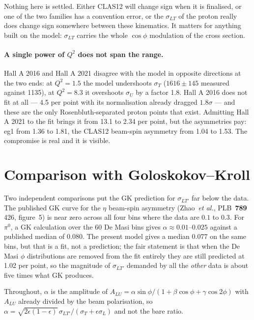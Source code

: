 \documentclass[11pt,a4paper]{article}
\newcommand{\sig}[1]{\sigma_{#1}}
\begin{document}
Nothing here is settled.  Either CLAS12 will change sign when it is finalised,
or one of the two families has a convention error, or the $\sig{LT}$ of the
proton really does change sign somewhere between these kinematics.  It matters
for anything built on the model: $\sig{LT}$ carries the whole $\cos\phi$
modulation of the cross section.

\paragraph{A single power of $Q^2$ does not span the range.}  Hall A 2016 and
Hall A 2021 disagree with the model in opposite directions at the two ends: at
$Q^2 = 1.5$ the model undershoots $\sig{T}$ ($1616 \pm 145$ measured against
1135), at $Q^2 = 8.3$ it overshoots $\sig{U}$ by a factor 1.8.  Hall A 2016
does not fit at all --- 4.5 per point with its normalisation already dragged
$1.8\sigma$ --- and these are the only Rosenbluth-separated proton points that
exist.  Admitting Hall A 2021 to the fit brings it from 13.1 to 2.34 per point,
but the asymmetries pay: eg1 from 1.36 to 1.81, the CLAS12 beam-spin asymmetry
from 1.04 to 1.53.  The compromise is real and it is visible.

\section{Comparison with Goloskokov--Kroll}

Two independent comparisons put the GK prediction for $\sig{LT'}$ far below the
data.  The published GK curve for the $\eta$ beam-spin asymmetry
(Zhao~\textit{et al.}, PLB~\textbf{789} 426, figure~5) is near zero across all
four bins where the data are $0.1$ to $0.3$.  For $\pi^0$, a GK calculation over
the 60 De Masi bins gives $\alpha \approx 0.01$--$0.025$ against a published
median of $0.080$.  The present model gives a median $0.077$ on the same bins,
but that is a fit, not a prediction; the fair statement is that when the De Masi
$\phi$ distributions are removed from the fit entirely they are still predicted
at 1.02 per point, so the magnitude of $\sig{LT'}$ demanded by all the
\emph{other} data is about five times what GK produces.

Throughout, $\alpha$ is the amplitude of $A_{LU} = \alpha\sin\phi/(1 + \beta
\cos\phi + \gamma\cos 2\phi)$ with $A_{LU}$ already divided by the beam
polarisation, so
$\alpha = \sqrt{2\epsilon(1-\epsilon)}\,\sig{LT'}/(\sig{T}+\epsilon\sig{L})$ and
not the bare ratio.
\end{document}
